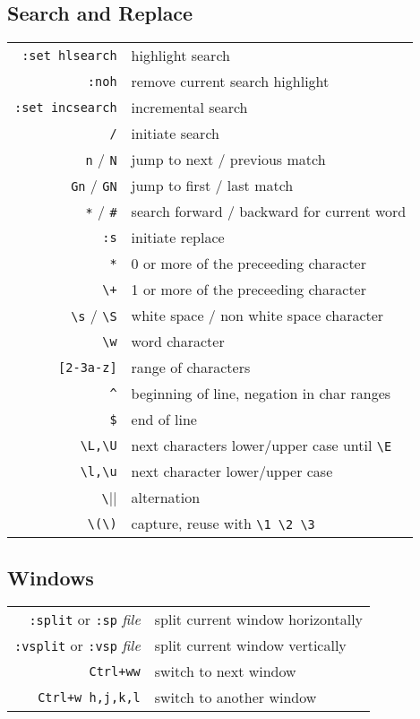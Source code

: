 \begin{multicols*}{3}
\subsection*{Search and Replace}
\begin{tabular}{@{}rl@{}}
\verb|:set hlsearch| & highlight search \\
\verb|:noh|      & remove current search highlight \\
\verb|:set incsearch| & incremental search \\
\verb|/|        & initiate search \\
\verb|n| / \verb|N| & jump to next / previous match \\
\verb|Gn| / \verb|GN| & jump to first / last match \\
\verb|*| / \verb|#| & search forward / backward for current word \\
\verb|:s|       & initiate replace \\
\verb|*|        & 0 or more of the preceeding character \\
\verb|\+|       & 1 or more of the preceeding character \\
\verb|\s| / \verb|\S|      & white space / non white space character \\
\verb|\w|       & word character \\
\verb|[2-3a-z]| & range of characters \\
\verb|^|        & beginning of line, negation in char ranges \\
\verb|$|        & end of line \\
\verb|\L,\U|    & next characters lower/upper case until \verb|\E| \\
\verb|\l,\u|    & next character lower/upper case \\
\verb|\||       & alternation \\
\verb|\(\)|     & capture, reuse with \verb|\1 \2 \3|
\end{tabular}

\subsection*{Windows}
\begin{tabular}{@{}rl@{}}
\verb|:split| or \verb|:sp| \itshape{file} & split current window horizontally \\
\verb|:vsplit| or \verb|:vsp| \itshape{file} & split current window vertically \\
\verb|Ctrl+ww| & switch to next window \\
\verb|Ctrl+w h,j,k,l| & switch to another window
\end{tabular}


\end{multicols*}
